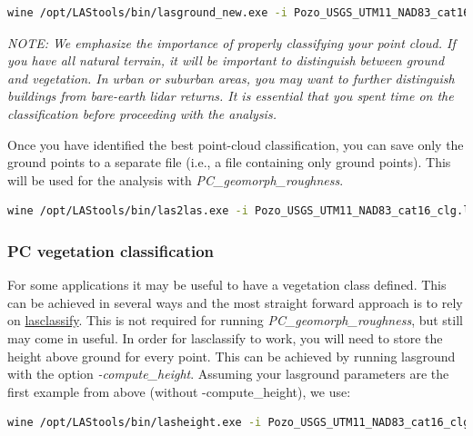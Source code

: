 \documentclass[a4paperpaper,,tablecaptionabove]{scrartcl}
\begin{document}
\begin{lstlisting}[language=bash]
wine /opt/LAStools/bin/lasground_new.exe -i Pozo_USGS_UTM11_NAD83_cat16_uncln.laz -wilderness -extra_fine -olaz -o Pozo_USGS_UTM11_NAD83_cat16_clg_lasground_new.laz 
\end{lstlisting}

\emph{NOTE: We emphasize the importance of properly classifying your
point cloud. If you have all natural terrain, it will be important to
distinguish between ground and vegetation. In urban or suburban areas,
you may want to further distinguish buildings from bare-earth lidar
returns. It is essential that you spent time on the classification
before proceeding with the analysis.}

Once you have identified the best point-cloud classification, you can
save only the ground points to a separate file (i.e., a file containing
only ground points). This will be used for the analysis with
\emph{PC\_geomorph\_roughness}.

\begin{lstlisting}[language=bash]
wine /opt/LAStools/bin/las2las.exe -i Pozo_USGS_UTM11_NAD83_cat16_clg.laz -keep_class 2 -olaz -o Pozo_USGS_UTM11_NAD83_cat16_clg_cl2.laz
\end{lstlisting}

\hypertarget{pc-vegetation-classification}{%
\subsubsection{PC vegetation
classification}\label{pc-vegetation-classification}}

For some applications it may be useful to have a vegetation class
defined. This can be achieved in several ways and the most straight
forward approach is to rely on
\href{https://rapidlasso.com/lastools/lasclassify/}{lasclassify}. This
is not required for running \emph{PC\_geomorph\_roughness}, but still
may come in useful. In order for lasclassify to work, you will need to
store the height above ground for every point. This can be achieved by
running lasground with the option \emph{-compute\_height}. Assuming your
lasground parameters are the first example from above (without
-compute\_height), we use:

\begin{lstlisting}[language=bash]
wine /opt/LAStools/bin/lasheight.exe -i Pozo_USGS_UTM11_NAD83_cat16_clg.laz -olaz -o Pozo_USGS_UTM11_NAD83_cat16_clgh.laz 
\end{lstlisting}
\end{document}
